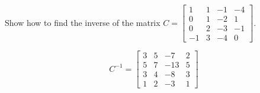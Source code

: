 
\begin{exerciseStatement}


Show how to find the inverse of the matrix \(C= \left[\begin{array}{cccc}
1 & 1 & -1 & -4 \\
0 & 1 & -2 & 1 \\
0 & 2 & -3 & -1 \\
-1 & 3 & -4 & 0
\end{array}\right] \).


\end{exerciseStatement}
    
\begin{exerciseAnswer} 
\[C^{-1}= \left[\begin{array}{cccc}
3 & 5 & -7 & 2 \\
5 & 7 & -13 & 5 \\
3 & 4 & -8 & 3 \\
1 & 2 & -3 & 1
\end{array}\right] \]
\end{exerciseAnswer}
    
